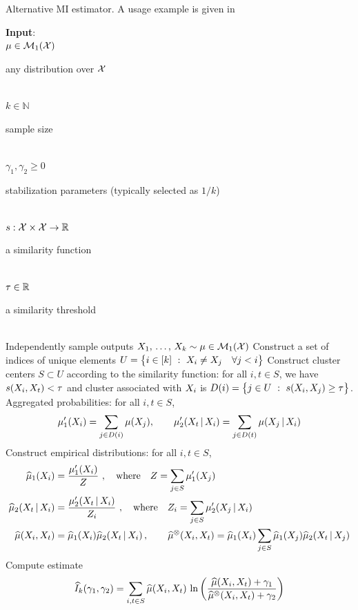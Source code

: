 \documentclass[a4paper]{article}
\theoremstyle{plain}
\theoremstyle{definition}
\theoremstyle{plain}
\begin{document}
\begin{algorithm}[t]
\caption{Alternative MI estimator. A usage example is given in }
\label{alg:MI2}
\begin{algorithmic}[1]
  \STATE \textbf{Input}:\\
  \quad $\mu \in {\mathcal{M}}_1({\mathcal{X}})$ \dotfill \parbox{8cm}{ any distribution over ${\mathcal{X}}$ }\\[2mm]
  \quad $k \in \mathbb{N}$ \dotfill \parbox{8cm}{ sample size }\\[2mm]
  \quad $\gamma_1, \gamma_2 \geq 0 $ \dotfill \parbox{8cm}{ stabilization parameters (typically selected as $1/k$) }\\[2mm]
  \quad $s:{\mathcal{X}}\times {\mathcal{X}} \rightarrow {\mathbb{R}}$ \dotfill \parbox{8cm}{ a similarity function }\\[2mm]
  \quad $\tau\in{\mathbb{R}}$ \dotfill \parbox{8cm}{ a similarity threshold }\\[2mm]
  \STATE Independently sample outputs $X_1, \, \ldots, \, X_k \sim \mu \in {\mathcal{M}}_1({\mathcal{X}})$
  \STATE Construct a set of indices of unique elements
  $U = \big\{i \in [k] ~:~ X_i \neq X_j \quad \forall j < i \big\}$
  \STATE Construct cluster centers $S\subset U$ according to the similarity function: for all $i,t\in S$, we have $s(X_i, X_t) < \tau$ and cluster associated with $X_i$ is $D(i) = \big\{j\in U~:~ s(X_i, X_j) \ge \tau \big\}$. Aggregated probabilities: for all $i,t\in S$,
  \begin{align*}
      \mu'_1(X_i) = \sum_{j\in D(i)} \mu(X_j), \qquad \mu'_2(X_t\,|\,X_i) = \sum_{j\in D(t)} \mu(X_j\,|\,X_i) 
  \end{align*}
  \STATE Construct empirical distributions: for all $i,t\in S$,
  \begin{align*}
    \widehat \mu_1(X_i) &= \frac{\mu'_1(X_i)}{Z}~, \quad \text{where} \quad Z = \sum_{j \in S} \mu'_1(X_j)\\
    \widehat \mu_2(X_t\,|\, X_i) &= \frac{\mu'_2(X_t\,|\, X_i)}{Z_i}~, \quad \text{where} \quad Z_i = \sum_{j \in S} \mu'_2(X_j\,|\, X_i)\\
    \widehat \mu(X_i, X_t) &= \widehat \mu_1(X_i) \widehat \mu_2(X_t\,|\, X_i)\,,\qquad \widehat \mu^{\otimes}(X_i, X_t) = \widehat \mu_1(X_i) \sum_{j\in S} \widehat \mu_1(X_j) \widehat \mu_2(X_t\,|\, X_j)
  \end{align*}
  \STATE Compute estimate
  \begin{align*}
    \widehat I_k(\gamma_1, \gamma_2) = \sum_{i,t \in S} \widehat \mu(X_i, X_t) \, \ln\left( 
    \frac{\widehat \mu(X_i, X_t) + \gamma_1}{\widehat \mu^{\otimes}(X_i, X_t) + \gamma_2}
     \right)
  \end{align*}
\end{algorithmic}
\end{algorithm}
%
\end{document}
